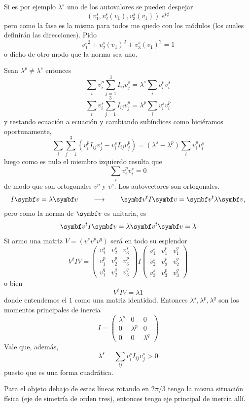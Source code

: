 \documentclass[10pt,oneside]{CBFT_book}
\begin{document}
Si es por ejemplo $\lambda^s$ uno de los autovalores se pueden despejar
\[
	(v_1^s, v_2^s(v_1), v_3^s(v_1) )\: e^{i\phi}
\]
pero como la fase es la misma para todos me quedo con los módulos (los cuales definirán las direcciones).
Pido 
\[
	{v_1^s}^2 +  {v_2^s(v_1)}^2 + {v_3^s(v_1)}^2 = 1
\]
o dicho de otro modo que la norma sea uno.

Sean $\lambda^p \neq \lambda^s$ entonces 
\[
	\sum_i v_i^p \sum_{j=1}^3 I_{ij} v_j^s = \lambda^s \sum_i v_i^p  v_i^s
\]
\[
	\sum_i v_i^s \sum_{j=1}^3 I_{ij} v_j^p = \lambda^p \sum_i v_i^s v_i^p
\]
y restando ecuación a ecuación y cambiando subíndices como hiciéramos oportunamente,
\[
	\sum_i \sum_{j=1}^3 ( v_i^p I_{ij} v_j^s - v_i^s I_{ij} v_j^p ) =
	(\lambda^s - \lambda^p )\sum_i v_i^p v_i^s 
\]
luego como es nulo el miembro izquierdo resulta que 
\[
	\sum_i v_i^p v_i^s = 0
\]
de modo que son ortogonales $v^p$ y $v^s$. Los autovectores son ortogonales.
\[
	I \vb{v} = \lambda \vb{v} \qquad \longrightarrow \qquad \vb{v}^t I \vb{v} = \vb{v}^t \lambda \vb{v},
\]
pero como la norma de $\vb{v}$ es unitaria, es 
\[
	\vb{v}^t I \vb{v} = \lambda \vb{v}^t  \vb{v} = \lambda
\]
Si armo una matriz $V = ( v^s v^p v^q)$ será en todo su esplendor
\[
	V^t I V = \begin{pmatrix}
	           v_1^s & v_2^s & v_3^s \\
	           v_1^p & v_2^p & v_3^p \\
	           v_1^q & v_2^q & v_3^q
	          \end{pmatrix}
	          I
		\begin{pmatrix}
	           v_1^s & v_1^p & v_1^q  \\
	           v_2^s & v_2^p & v_2^q \\
	           v_3^s & v_3^p & v_3^q
	          \end{pmatrix}
\]
o bien
\[
	V^t I V = \lambda 1
\]
donde entendemos el $1$ como una matriz identidad. Entonces $\lambda^s, \lambda^p, \lambda^q$ son los momentos
principales de inercia
\[
	I = \begin{pmatrix}
	     \lambda^s & 0 & 0 \\
	     0 & \lambda^p & 0 \\
	     0 & 0  &  \lambda^q
	    \end{pmatrix}
\]
Vale que, además,
\[
	\lambda^s = \sum_{ij}  v^s_i I_{ij} v^s_j > 0
\]
puesto que es una forma cuadrática.

Para el objeto debajo de estas líneas rotando en $2\pi/3$ tengo la misma situación física (eje de simetría de
orden tres), entonces tengo eje principal de inercia allí.
\end{document}
